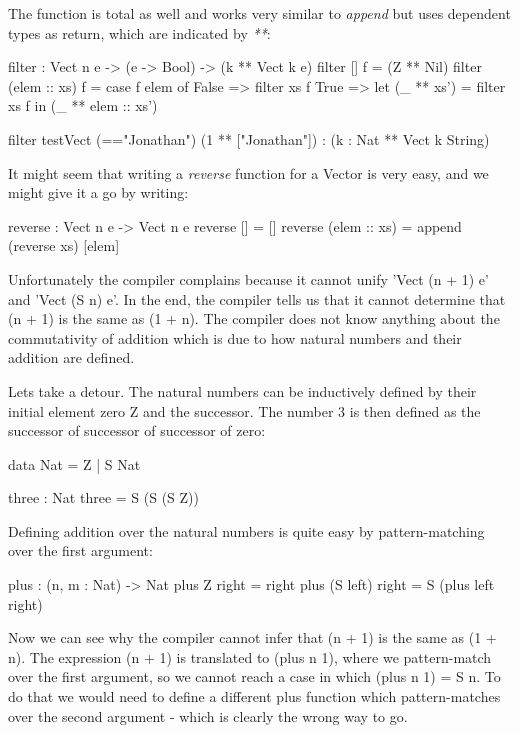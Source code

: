 The function is total as well and works very similar to \textit{append} but uses dependent types as return, which are indicated by \textit{**}:

\begin{HaskellCode}
filter : Vect n e -> (e -> Bool) -> (k ** Vect k e)
filter [] f = (Z ** Nil)
filter (elem :: xs) f =
  case f elem of
    False => filter xs f
    True  => let (_ ** xs') = filter xs f
             in  (_ ** elem :: xs')
             
filter testVect (=="Jonathan")
(1 ** ["Jonathan"]) : (k : Nat ** Vect k String)
\end{HaskellCode}

It might seem that writing a \textit{reverse} function for a Vector is very easy, and we might give it a go by writing:
\begin{HaskellCode}
reverse : Vect n e -> Vect n e
reverse [] = []
reverse (elem :: xs) = append (reverse xs) [elem]
\end{HaskellCode}

Unfortunately the compiler complains because it cannot unify 'Vect (n + 1) e' and 'Vect (S n) e'. In the end, the compiler tells us that it cannot determine that (n + 1) is the same as (1 + n). The compiler does not know anything about the commutativity of addition which is due to how natural numbers and their addition are defined.

Lets take a detour. The natural numbers can be inductively defined by their initial element zero Z and the successor. The number 3 is then defined as the successor of successor of successor of zero:

\begin{HaskellCode}
data Nat = Z | S Nat

three : Nat 
three = S (S (S Z))
\end{HaskellCode}

Defining addition over the natural numbers is quite easy by pattern-matching over the first argument: 

\begin{HaskellCode}
plus : (n, m : Nat) -> Nat
plus Z right        = right
plus (S left) right = S (plus left right)
\end{HaskellCode}

Now we can see why the compiler cannot infer that (n + 1) is the same as (1 + n). The expression (n + 1) is translated to (plus n 1), where we pattern-match over the first argument, so we cannot reach a case in which (plus n 1) = S n. To do that we would need to define a different plus function which pattern-matches over the second argument - which is clearly the wrong way to go.

